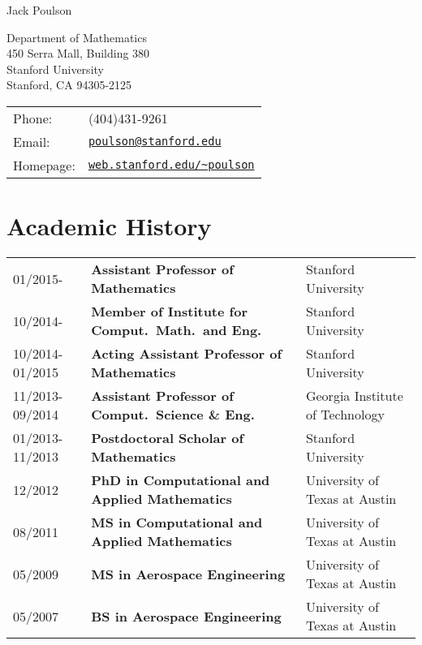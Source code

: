 \documentclass[letterpaper]{article}
\def\name{Jack Poulson}
\begin{document}
{\huge \name}

\vspace{0.25in}

\begin{minipage}{0.45\linewidth}
  Department of Mathematics \\
  450 Serra Mall, Building 380 \\
  Stanford University \\
  Stanford, CA 94305-2125
\end{minipage}
\begin{minipage}{0.45\linewidth}
  \begin{tabular}{ll}
    Phone:&(404)431-9261 \\
    Email:&\href{mailto:poulson@stanford.edu}{\tt poulson@stanford.edu} \\
    Homepage: & \href{http://web.stanford.edu/~poulson}{\tt web.stanford.edu/\textasciitilde poulson} \\
  \end{tabular}
\end{minipage}

\section*{Academic History}

\begin{tabular}{lll}
01/2015-        & {\bf Assistant Professor of Mathematics}               & Stanford University \\
10/2014-        & {\bf Member of Institute for Comput.\ Math.\ and Eng.} & Stanford University \\
10/2014-01/2015 & {\bf Acting Assistant Professor of Mathematics}        & Stanford University \\
11/2013-09/2014 & {\bf Assistant Professor of Comput.\ Science \& Eng. } & Georgia Institute of Technology \\
01/2013-11/2013 & {\bf Postdoctoral Scholar of Mathematics}              & Stanford University \\
12/2012         & {\bf PhD in Computational and Applied Mathematics}     & University of Texas at Austin \\
08/2011         & {\bf MS in Computational and Applied Mathematics}      & University of Texas at Austin \\
05/2009         & {\bf MS in Aerospace Engineering}                      & University of Texas at Austin \\
05/2007         & {\bf BS in Aerospace Engineering}                      & University of Texas at Austin \\
\end{tabular}
\end{document}
